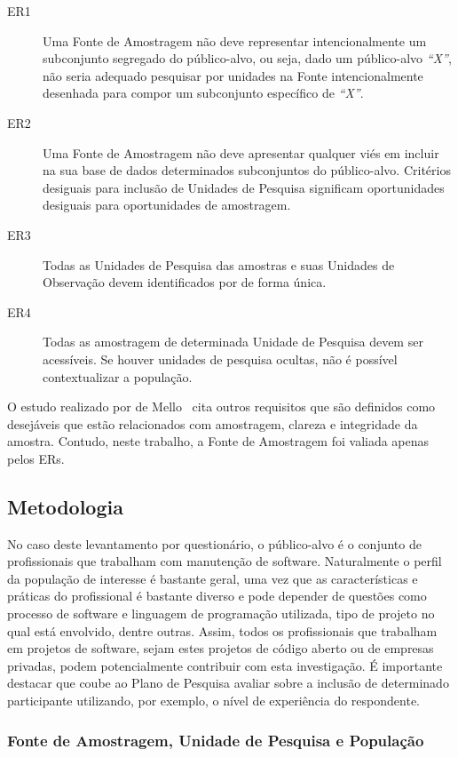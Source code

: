 \begin{description}
	\item[ER1] Uma Fonte de Amostragem não deve representar intencionalmente um
		subconjunto segregado do público-alvo, ou seja, dado um público-alvo
		\textit{``X''}, não seria adequado pesquisar por unidades na Fonte
		intencionalmente desenhada para compor um subconjunto específico de
		\textit{``X''}.
	\item[ER2] Uma Fonte de Amostragem não deve apresentar qualquer viés em
		incluir na sua base de dados determinados subconjuntos do público-alvo.
		Critérios desiguais para inclusão de Unidades de Pesquisa significam
		oportunidades desiguais para oportunidades de amostragem.
	\item[ER3] Todas as Unidades de Pesquisa das amostras e suas Unidades de
		Observação devem identificados por de forma única.
	\item[ER4] Todas as amostragem de determinada Unidade de Pesquisa devem ser
		acessíveis. Se houver unidades de pesquisa ocultas, não é possível
		contextualizar a população.
\end{description}

O estudo realizado por de Mello~\cite{de2014towards} cita outros requisitos que
são definidos como desejáveis que estão relacionados com amostragem, clareza e
integridade da amostra. Contudo, neste trabalho, a Fonte de Amostragem foi
valiada apenas pelos ERs.

\subsection{Metodologia}
\label{subsec:pesq_metodologias}

No caso deste levantamento por questionário, o público-alvo é o conjunto de
profissionais que trabalham com manutenção de software. Naturalmente o perfil da
população de interesse é bastante geral, uma vez que as características e
práticas do profissional é bastante diverso e pode depender de questões como
processo de software e linguagem de programação utilizada, tipo de projeto no
qual está envolvido, dentre outras. Assim, todos os profissionais que trabalham
em projetos de software, sejam estes projetos de código aberto ou de empresas
privadas, podem potencialmente contribuir com esta investigação. É importante
destacar que coube ao Plano de Pesquisa avaliar sobre a inclusão de determinado
participante utilizando, por exemplo, o nível de experiência do respondente.

\subsubsection{Fonte de Amostragem, Unidade de Pesquisa e População}
\label{subsubsec:fontes_amostragem}

